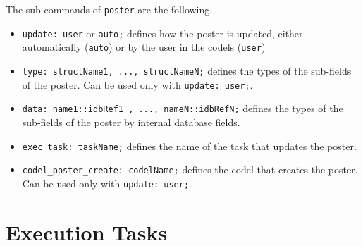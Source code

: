 \noindent
The sub-commands of \texttt{poster} are the following.

\begin{itemize}
\item[]\texttt{update:  user} or \texttt{auto;} defines how the poster is updated,
either automatically (\texttt{auto}) or by the user in the codels (\texttt{user})

\item[]\texttt{type:  structName1, ..., structNameN;} defines the types of
the sub-fields of the poster. Can be used only with \texttt{update:  user;}.

\item[]\texttt{data:  name1::idbRef1 , ..., nameN::idbRefN;} defines the
types of the sub-fields of the poster by internal database fields.

\item[]\texttt{exec\_task:  taskName;} defines the name of the task that updates
the poster.

\item[]\texttt{codel\_poster\_create:  codelName;} defines the codel that creates
the poster. Can be used only with \texttt{update:  user;}.
\end{itemize}

\section{Execution Tasks}
\label{sec|exec-task}

